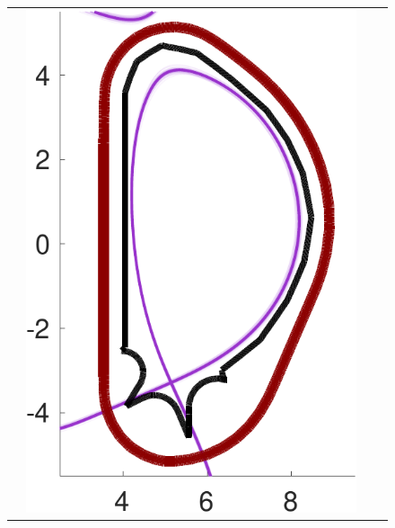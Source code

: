 \documentclass{beamer}
\begin{document}
\begin{frame}[t]
\begin{itemize}[leftmargin=5pt]
\begin{figure}[ht!]
{\begin{tabular}{cccc}
&\includegraphics[width=1\linewidth]{QoI_MLMC_DirectSolver_Interp2CommonGrid.pdf}

\end{tabular}}
\end{figure}
\end{itemize}
\end{frame}
\end{document}
